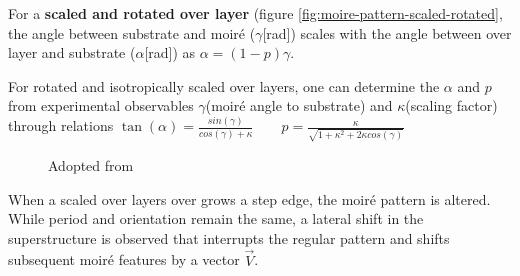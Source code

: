 For a \textbf{scaled and rotated over layer} (figure \ref{fig:moire-pattern-scaled-rotated}, the angle between substrate and moir\'e ($\gamma$[rad]) scales with the angle between over layer and substrate ($\alpha$[rad]) as $\alpha=(1-p)\gamma$.

For rotated and isotropically scaled over layers, one can determine the $\alpha$ and $p$ from experimental observables $\gamma$(moir\'e angle to substrate) and $\kappa$(scaling factor) through relations $ \tan(\alpha)=\frac{sin(\gamma)}{cos(\gamma)+\kappa}\qquad p=\frac{\kappa}{\sqrt{1+\kappa^2+2\kappa cos(\gamma)}}$


\begin{figure} \centering
	\caption{Adopted from \cite{hermann_periodic_2012}}
	\label{fig:moire-pattern}
\end{figure}

When a scaled over layers over grows a step edge, the moir\'e pattern is altered. While period and orientation remain the same, a lateral shift in the superstructure is observed that interrupts the regular pattern and shifts subsequent moir\'e features by a vector $\vec{V}$.

